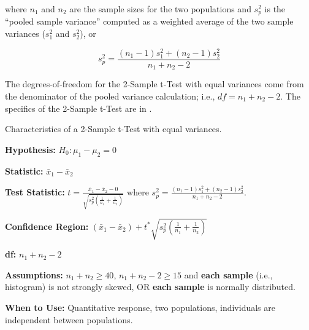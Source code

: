 \documentclass[10pt,openany]{book}\usepackage[]{graphicx}\usepackage[]{color}
\begin{document}
where $n_{1}$ and $n_{2}$ are the sample sizes for the two populations and $s_{p}^{2}$ is the ``pooled sample variance'' computed as a weighted average of the two sample variances ($s_{1}^{2}$ and $s_{2}^{2}$), or

\[s_{p}^{2}=\frac{(n_{1}-1)s_{1}^{2}+(n_{2}-1)s_{2}^{2}}{n_{1}+n_{2}-2} \]

The degrees-of-freedom for the 2-Sample t-Test with equal variances come from the denominator of the pooled variance calculation; i.e., $df=n_{1}+n_{2}-2$. The specifics of the 2-Sample t-Test are in .

\vspace*{12pt}
\begin{table}[h]
\centering
\colorbox{ltgray}{
\begin{minipage}{.8\textwidth}
  \centering
	\caption{Characteristics of a 2-Sample t-Test with equal variances.}\label{tab:2tspec}
  \begin{Itemize}
      \item \textbf{Hypothesis:} $H_{0}:\mu_{1}-\mu_{2}=0$
      \item \textbf{Statistic:} $\bar{x}_{1}-\bar{x}_{2}$
      \item \textbf{Test Statistic:} $t=\frac{\bar{x}_{1}-\bar{x}_{2}-0}{\sqrt{s_{p}^{2}\left(\frac{1}{n_{1}}+\frac{1}{n_{2}} \right)}}$ where $s_{p}^{2}=\frac{(n_{1}-1)s_{1}^{2}+(n_{2}-1)s_{2}^{2}}{n_{1}+n_{2}-2}$.
      \vspace{6pt}
      \item \textbf{Confidence Region:} $(\bar{x}_{1}-\bar{x}_{2})+t^{*}\sqrt{s_{p}^{2}\left(\frac{1}{n_{1}}+\frac{1}{n_{2}} \right)}$
      \vspace{6pt}
      \item \textbf{df:} $n_{1}+n_{2}-2$
      \item \textbf{Assumptions:} $n_{1}+n_{2}\geq40$, $n_{1}+n_{2}-2\geq15$ and \textbf{each sample} (i.e., histogram) is not strongly skewed, OR \textbf{each sample} is normally distributed.
      \item \textbf{When to Use:} Quantitative response, two populations, individuals are independent between populations.
  \end{Itemize}
\end{minipage}}
\end{table}
\vspace*{12pt}

\end{document}
